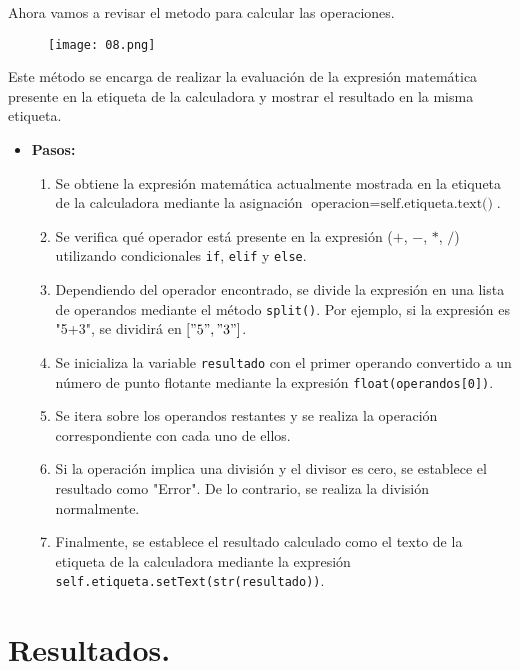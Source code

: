 \documentclass[11pt]{article}
\begin{document}
Ahora vamos a revisar el metodo para calcular las operaciones.
\begin{figure}[H]
		\begin{center}
 			\texttt{[image: 08.png]}
 			
		\end{center} 
\end{figure}
  Este método se encarga de realizar la evaluación de la expresión matemática presente en la etiqueta de la calculadora y mostrar el resultado en la misma etiqueta.
\begin{itemize}
    
    \item \textbf{Pasos:}
    \begin{enumerate}
        \item Se obtiene la expresión matemática actualmente mostrada en la etiqueta de la calculadora mediante la asignación \( \text{operacion} = \text{self.etiqueta.text()} \).
        \item Se verifica qué operador está presente en la expresión (\(+\), \(-\), \(*\), \(/ \)) utilizando condicionales \texttt{if}, \texttt{elif} y \texttt{else}.
        \item Dependiendo del operador encontrado, se divide la expresión en una lista de operandos mediante el método \texttt{split()}. Por ejemplo, si la expresión es "5+3", se dividirá en \(["5", "3"]\).
        \item Se inicializa la variable \texttt{resultado} con el primer operando convertido a un número de punto flotante mediante la expresión \texttt{float(operandos[0])}.
        \item Se itera sobre los operandos restantes y se realiza la operación correspondiente con cada uno de ellos.
        \item Si la operación implica una división y el divisor es cero, se establece el resultado como "Error". De lo contrario, se realiza la división normalmente.
        \item Finalmente, se establece el resultado calculado como el texto de la etiqueta de la calculadora mediante la expresión \texttt{self.etiqueta.setText(str(resultado))}.
    \end{enumerate}
\end{itemize} 

\section{Resultados.}
\end{document}
